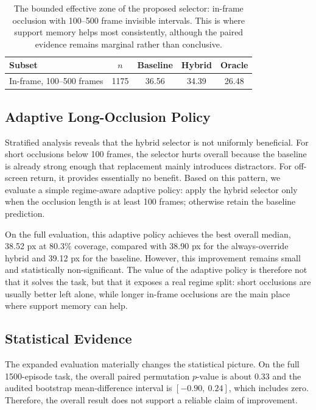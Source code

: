 \documentclass[10pt,journal,compsoc]{IEEEtran}
\begin{document}
\begin{table}[t]
    \centering
    \caption{The bounded effective zone of the proposed selector: in-frame occlusion with 100--500 frame invisible intervals. This is where support memory helps most consistently, although the paired evidence remains marginal rather than conclusive.}
    \label{tab:effective_zone}
    \setlength{\tabcolsep}{4pt}
    \begin{tabular}{lcccc}
        \toprule
        Subset & $n$ & Baseline & Hybrid & Oracle \\
        \midrule
        In-frame, 100--500 frames & 1175 & 36.56 & 34.39 & 26.48 \\
        \bottomrule
    \end{tabular}
\end{table}

\subsection{Adaptive Long-Occlusion Policy}

Stratified analysis reveals that the hybrid selector is not uniformly beneficial. For short occlusions below 100 frames, the selector hurts overall because the baseline is already strong enough that replacement mainly introduces distractors. For off-screen return, it provides essentially no benefit. Based on this pattern, we evaluate a simple regime-aware adaptive policy: apply the hybrid selector only when the occlusion length is at least 100 frames; otherwise retain the baseline prediction.

On the full evaluation, this adaptive policy achieves the best overall median, 38.52 px at 80.3\% coverage, compared with 38.90 px for the always-override hybrid and 39.12 px for the baseline. However, this improvement remains small and statistically non-significant. The value of the adaptive policy is therefore not that it solves the task, but that it exposes a real regime split: short occlusions are usually better left alone, while longer in-frame occlusions are the main place where support memory can help.

\subsection{Statistical Evidence}

The expanded evaluation materially changes the statistical picture. On the full 1500-episode task, the overall paired permutation $p$-value is about 0.33 and the audited bootstrap mean-difference interval is $[-0.90,\ 0.24]$, which includes zero. Therefore, the overall result does not support a reliable claim of improvement.
\end{document}
